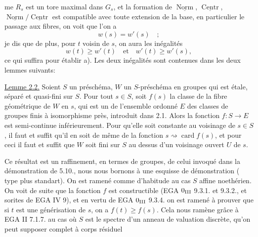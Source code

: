 
me $R_s$ est un tore maximal dans $G_s$, et la formation de $\underline{\operatorname{Norm}}$, $\underline{\operatorname{Centr}}$, $\underline{\operatorname{Norm}}/\underline{\operatorname{Centr}}$ est compatible avec toute extension de la base, en particulier le passage aux fibres, on voit que l'on a
\[
w(s)=w'(s)\quad;
\]
je dis que de plus, pour $t$ voisin de $s$, on aura les inégalités
\[
w(t)\geq w'(t)\quad\text{et}\quad w'(t)\geq w'(s),
\]
ce qui suffira pour établir a).  Les deux inégalités  sont contenues dans les deux lemmes suivants:

\uline{Lemme 2.2.} Soient $S$ un préschéma, $W$ un $S$-préschéma en groupes qui est étale,  séparé et quasi-fini sur $S$. Pour tout $s\in S$, soit $f(s)$ la classe de la fibre géométrique de $W$ en $s$, qui est un  de l'ensemble ordonné $E$ des classes de groupes finis à isomorphisme près, introduit dans 2.1. Alors la fonction $f:S\longrightarrow E$ est semi-continue inférieurement. Pour qu'elle soit constante au voisinage de $s\in S$,  il faut et suffit qu'il en soit de même de la fonction $s\rightsquigarrow\operatorname{card}f(s)$, et pour ceci il faut et suffit que $W$ soit fini sur $S$ au dessus d'un voisinage ouvert $U$ de $s$.

Ce résultat est un raffinement, en termes de groupes, de celui invoqué dans la démonstration de  5.10., nous nous bornons à une esquisse de  démonstration ( type  plus standart). On est ramené comme d'habitude au cas $S$ affine noethérien. On voit de suite que la fonction $f$ est constructible (EGA  $0_{\rm III}$ 9.3.1. et 9.3.2., et sorites de EGA IV 9), et en vertu de EGA $0_{\rm III}$ 9.3.4. on est ramené  à prouver que si $t$ est une générisation de $s$, on a $f(t)\geq f(s)$. Cela nous ramène  grâce à EGA II 7.1.7. au cas où $S$ est le spectre d'un anneau de valuation discrète, qu'on peut supposer complet à corps résiduel
